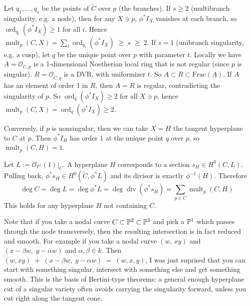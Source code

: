 \documentclass[12pt]{article}
\begin{document}
\begin{solution}
\begin{enumerate}
              Let $q_1,\dots,q_s$ be the points of $\widetilde{C}$ over $p$ (the branches). If $s\ge 2$ (multibranch singularity, e.g. a node), then for any $X\ni p$, $\phi^*I_X$ vanishes at each branch, so $\operatorname{ord}_{q_i}(\phi^*I_X)\ge 1$ for all $i$. Hence
              $\operatorname{mult}_p(C,X)=\sum_i \operatorname{ord}_{q_i}(\phi^*I_X)\;\ge\; s\;\ge\;2.$ If $s=1$ (unibranch singularity, e.g. a cusp), let $q$ be the unique point over $p$ with parameter $t$. Locally we have $A = \mathcal O_{C,p} $ is a 1-dimensional Noetherian local ring that is not regular (since $p$ is singular). $R = \mathcal O_{\widetilde C, q}$ is a DVR, with uniformizer $t$. So $A\subset R\subset \mathrm{Frac}(A)$. If $A$ has an element of order 1 in $R$, then $A=R$ is regular, contradicting the singularity of $p$. So $\operatorname{ord}_q(\phi^*I_X)\ge 2$ for all $X\ni p$, hence $\operatorname{mult}_p(C,X)=\operatorname{ord}_q(\phi^*I_X)\ge 2.$

              Conversely, if $p$ is nonsingular, then we can take $X = H$ the tangent hyperplane to $C$ at $p$. Then $\phi^*I_H$ has order 1 at the unique point $q$ over $p$, so $\operatorname{mult}_p(C,H)=1.$

              Let $L:=\mathcal O_{\mathbb P^r}(1)\vert_C$. A hyperplane $H$ corresponds to a section $s_H\in H^0(C,L)$. Pulling back, $\phi^*s_H\in H^0(\widetilde C,\phi^*L)$ and its divisor is exactly $\phi^{-1}(H)$. Therefore $$\deg C=\deg L=\deg \phi^*L =\deg \operatorname{div}(\phi^*s_H)
                  =\sum_{p\in C}\operatorname{mult}_p(C,H)$$This holds for any hyperplane $H$ not containing $C$.
    \end{enumerate}
\end{solution}


\begin{remark}
    Note that if you take a nodal curve $C\subset \P^2\subset \P^3$ and pick a $\P^1$ which passes through the node transversely, then the resulting intersection is in fact reduced and smooth. For example if you take a nodal curve $(w,\,xy)$ and $(x-\beta w,\; y-\alpha w)$ and $\alpha,\beta\in k$. Then $(w,xy)\;+\;(x-\beta w,\; y-\alpha w)\;=\;(w,x,y)$, I was just suprised that you can start with something singular, intersect with something else and get something smooth. This is the basis of Bertini-type theorems: a general enough hyperplane cut of a singular variety often avoids carrying the singularity forward, unless you cut right along the tangent cone.
\end{remark}
\end{document}
